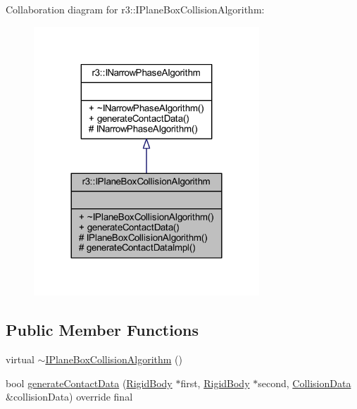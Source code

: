 Collaboration diagram for r3\+:\+:I\+Plane\+Box\+Collision\+Algorithm\+:\nopagebreak
\begin{figure}[H]
\begin{center}
\leavevmode
\includegraphics[width=240pt]{classr3_1_1_i_plane_box_collision_algorithm__coll__graph}
\end{center}
\end{figure}
\subsection*{Public Member Functions}
\begin{DoxyCompactItemize}
\item 
virtual \mbox{\hyperlink{classr3_1_1_i_plane_box_collision_algorithm_a1a1d1348a9e42970cfa770fa6017d4ed}{$\sim$\+I\+Plane\+Box\+Collision\+Algorithm}} ()
\item 
bool \mbox{\hyperlink{classr3_1_1_i_plane_box_collision_algorithm_aacbbfc59a3cb174876bd5cffad22f1fc}{generate\+Contact\+Data}} (\mbox{\hyperlink{classr3_1_1_rigid_body}{Rigid\+Body}} $\ast$first, \mbox{\hyperlink{classr3_1_1_rigid_body}{Rigid\+Body}} $\ast$second, \mbox{\hyperlink{classr3_1_1_collision_data}{Collision\+Data}} \&collision\+Data) override final
\end{DoxyCompactItemize}
